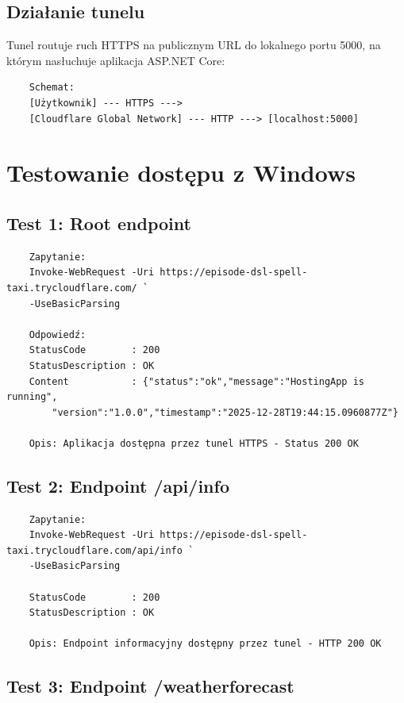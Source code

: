 \documentclass[twoside]{article}
\begin{document}
\subsection{Działanie tunelu}

Tunel routuje ruch HTTPS na publicznym URL do lokalnego portu 5000, na którym nasłuchuje aplikacja ASP.NET Core:

\begin{verbatim}
	Schemat:
	[Użytkownik] --- HTTPS ---> 
	[Cloudflare Global Network] --- HTTP ---> [localhost:5000]
\end{verbatim}

\section{Testowanie dostępu z Windows}

\subsection{Test 1: Root endpoint}

\begin{verbatim}
	Zapytanie:
	Invoke-WebRequest -Uri https://episode-dsl-spell-taxi.trycloudflare.com/ `
	-UseBasicParsing
	
	Odpowiedź:
	StatusCode        : 200
	StatusDescription : OK
	Content           : {"status":"ok","message":"HostingApp is running",
		"version":"1.0.0","timestamp":"2025-12-28T19:44:15.0960877Z"}
	
	Opis: Aplikacja dostępna przez tunel HTTPS - Status 200 OK
\end{verbatim}

\subsection{Test 2: Endpoint /api/info}

\begin{verbatim}
	Zapytanie:
	Invoke-WebRequest -Uri https://episode-dsl-spell-taxi.trycloudflare.com/api/info `
	-UseBasicParsing
	
	StatusCode        : 200
	StatusDescription : OK
	
	Opis: Endpoint informacyjny dostępny przez tunel - HTTP 200 OK
\end{verbatim}

\subsection{Test 3: Endpoint /weatherforecast}
\end{document}
